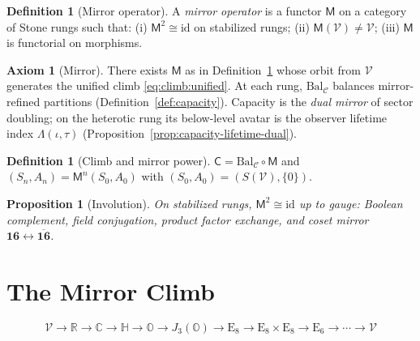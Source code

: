 \documentclass[11pt]{article}
\theoremstyle{plain}
\newtheorem{proposition}[theorem]{Proposition}
\theoremstyle{definition}
\newtheorem{axiom}[theorem]{Axiom}
\newtheorem{definition}[theorem]{Definition}
\theoremstyle{remark}
\numberwithin{equation}{section}
\newcommand{\R}{\mathbb{R}}
\newcommand{\C}{\mathbb{C}}
\newcommand{\Quat}{\mathbb{H}}
\newcommand{\Oct}{\mathbb{O}}
\newcommand{\jalg}{J_3(\mathbb{O})}
\newcommand{\E}[1]{\mathrm{E}_{#1}}
\newcommand{\Void}{\mathcal{V}}
\newcommand{\Mirror}{\mathsf{M}}
\newcommand{\Climb}{\mathsf{C}}
\begin{document}
\begin{definition}[Mirror operator]\label{def:mirror}
A \emph{mirror operator} is a functor $\Mirror$ on a category of Stone rungs
such that: (i) $\Mirror^2\cong\mathrm{id}$ on stabilized rungs; (ii)
$\Mirror(\Void)\neq\Void$; (iii) $\Mirror$ is functorial on morphisms.
\end{definition}

\begin{axiom}[Mirror]\label{ax:mirror}
There exists $\Mirror$ as in Definition~\ref{def:mirror} whose orbit from
$\Void$ generates the unified climb \eqref{eq:climb:unified}. At each rung,
$\mathrm{Bal}_{\mathcal{C}}$ balances mirror-refined partitions
(Definition~\ref{def:capacity}). Capacity is the \emph{dual mirror} of
sector doubling; on the heterotic rung its below-level avatar is the observer
lifetime index $\Lambda(\iota,\tau)$
(Proposition~\ref{prop:capacity-lifetime-dual}).
\end{axiom}

\begin{definition}[Climb and mirror power]\label{def:climb}
$\Climb=\mathrm{Bal}_{\mathcal{C}}\circ\Mirror$ and
$(S_n,A_n)=\Mirror^n(S_0,A_0)$ with $(S_0,A_0)=(S(\Void),\{0\})$.
\end{definition}

\begin{proposition}[Involution]\label{prop:mirror:involution}
On stabilized rungs, $\Mirror^2\cong\mathrm{id}$ up to gauge: Boolean
complement, field conjugation, product factor exchange, and coset mirror
$\mathbf{16}\leftrightarrow\overline{\mathbf{16}}$.
\end{proposition}%
\section{The Mirror Climb}
\label{sec:climb}

\begin{equation}\label{eq:climb:unified}
  \Void\to\R\to\C\to\Quat\to\Oct\to\jalg\to\E{8}\to\E{8}\times\E{8}\to\E{6}\to\cdots\to\Void
\end{equation}
\end{document}
